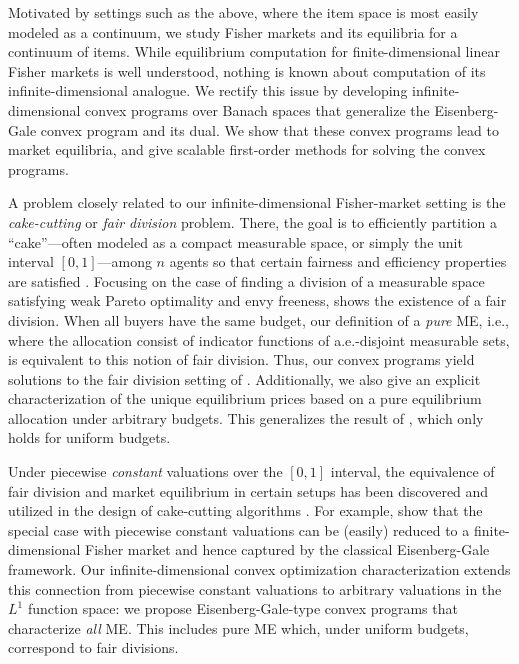 Motivated by settings such as the above, where the item space is most easily modeled as a continuum, we study Fisher markets and its equilibria for a continuum of items.
    While equilibrium computation for finite-dimensional linear Fisher markets is well understood, nothing is known about computation of its infinite-dimensional analogue. We rectify this issue by developing infinite-dimensional convex programs over Banach spaces that generalize the Eisenberg-Gale convex program and its dual. We show that these convex programs lead to market equilibria, and give scalable first-order methods for solving the convex programs.


A problem closely related to our infinite-dimensional Fisher-market setting is the \textit{cake-cutting} or \textit{fair division} problem. 
There, the goal is to efficiently partition a ``cake''---often modeled as a compact measurable space, or simply the unit interval $[0,1]$---among $n$ agents so that certain fairness and efficiency properties are satisfied \citep{weller1985fair,brams1996fair,cohler2011optimal,procaccia2013cake,cohler2011optimal,brams2012maxsum,chen2013truth,aziz2014cake,aziz2016discrete,deng2012algorithmic}.
Focusing on the case of finding a division of a measurable space satisfying weak Pareto optimality and envy freeness, \citet{weller1985fair} shows the existence of a fair division.
When all buyers have the same budget, our definition of a \textit{pure} ME, i.e., where the allocation consist of indicator functions of a.e.-disjoint measurable sets, is equivalent to this notion of fair division.
Thus, our convex programs yield solutions to the fair division setting of \citet{weller1985fair}.
Additionally, we also give an explicit characterization of the unique equilibrium prices based on a pure equilibrium allocation under arbitrary budgets. 
This generalizes the result of \citet{weller1985fair}, which only holds for uniform budgets.

Under piecewise \emph{constant} valuations over the $[0,1]$ interval, the equivalence of fair division and market equilibrium in certain setups has been discovered and utilized in the design of cake-cutting algorithms \citep{brams2012maxsum,aziz2014cake}. 
For example, \citet{aziz2014cake} show that the special case with piecewise constant valuations can be (easily) reduced to a finite-dimensional Fisher market and hence captured by the classical Eisenberg-Gale framework. 
Our infinite-dimensional convex optimization characterization extends this connection from piecewise constant valuations to arbitrary valuations in the $L^1$ function space: we propose Eisenberg-Gale-type convex programs that characterize \textit{all} ME. This includes pure ME which, under uniform budgets, correspond to fair divisions. 

